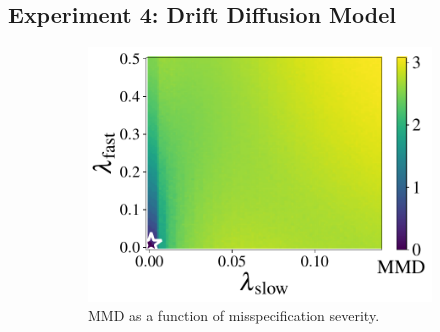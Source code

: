 \documentclass[twoside,11pt]{article}
\newcommand{\numberDDM}{4}
\newcommand{\0}{\boldsymbol{0}}
\begin{document}
\subsection{Experiment \numberDDM: Drift Diffusion Model}
\label{sec:ddm-experiment}
\begin{figure}[t]
    \begin{subfigure}[t]{0.33\linewidth}
        \includegraphics[width=\linewidth]{abf_ddm_unbounded_grid.pdf}
        \caption{MMD as a function of misspecification severity.}
        \label{fig:exp:ddm-mmd-contamination}
    \end{subfigure}
    \hfill
    \begin{subfigure}[t]{0.62\linewidth}

\end{subfigure}
\end{figure}
\end{document}
